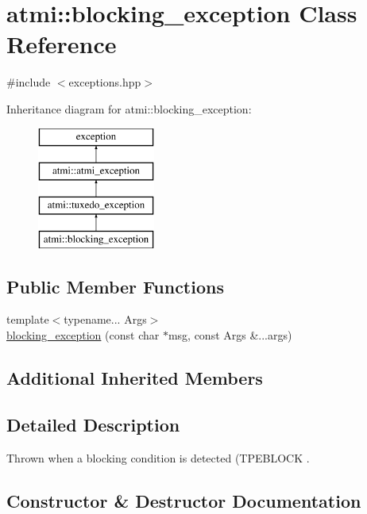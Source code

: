\hypertarget{classatmi_1_1blocking__exception}{}\section{atmi\+:\+:blocking\+\_\+exception Class Reference}
\label{classatmi_1_1blocking__exception}


{\ttfamily \#include $<$exceptions.\+hpp$>$}

Inheritance diagram for atmi\+:\+:blocking\+\_\+exception\+:\begin{figure}[H]
\begin{center}
\leavevmode
\includegraphics[height=4.000000cm]{classatmi_1_1blocking__exception}
\end{center}
\end{figure}
\subsection*{Public Member Functions}
\begin{DoxyCompactItemize}
\item 
{\footnotesize template$<$typename... Args$>$ }\\\hyperlink{classatmi_1_1blocking__exception_a2237c2b5b3264745e145d0e4e26838ad}{blocking\+\_\+exception} (const char $\ast$msg, const Args \&...args)
\end{DoxyCompactItemize}
\subsection*{Additional Inherited Members}


\subsection{Detailed Description}
Thrown when a blocking condition is detected (T\+P\+E\+B\+L\+O\+CK . 

\subsection{Constructor \& Destructor Documentation}
